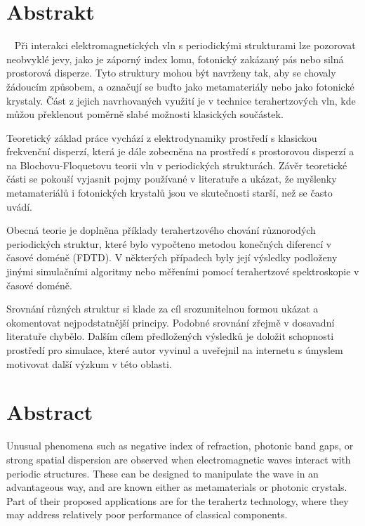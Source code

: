 
\vspace{-20mm}
\chapter*{Abstrakt}
\noindent ~
Při interakci elektromagnetických vln s periodickými strukturami lze pozorovat neobvyklé jevy, jako je záporný index lomu, fotonický zakázaný pás nebo silná prostorová disperze. Tyto struktury mohou být navrženy tak, aby se chovaly žádoucím způsobem, a označují se buďto jako metamateriály nebo jako fotonické krystaly. Část z jejich navrhovaných využití je v technice terahertzových vln, kde můžou překlenout poměrně slabé možnosti klasických součástek.  

Teoretický základ práce vychází z elektrodynamiky prostředí s klasickou frekvenční disperzí, která je dále zobecněna na prostředí s prostorovou disperzí a na Blochovu-Floquetovu teorii vln v periodických strukturách. Závěr teoretické části se pokouší vyjasnit pojmy používané v literatuře a ukázat, že myšlenky metamateriálů i fotonických krystalů jsou ve skutečnosti starší, než se často uvádí.

Obecná teorie je doplněna příklady terahertzového chování různorodých periodických struktur, které bylo vypočteno metodou konečných diferencí v časové doméně (FDTD). V některých případech byly její výsledky podloženy jinými simulačními algoritmy nebo měřeními pomocí terahertzové spektroskopie v časové doméně.

Srovnání  různých struktur si klade za cíl srozumitelnou formou ukázat a okomentovat nejpodstatnější principy. Podobné srovnání zřejmě v dosavadní literatuře chybělo. Dalším cílem předložených výsledků je doložit schopnosti prostředí pro simulace, které autor vyvinul a uveřejnil na internetu s úmyslem motivovat další výzkum v této oblasti. 

\vspace{0mm}
{\let\clearpage\relax\chapter*{Abstract}}
\noindent
Unusual phenomena such as negative index of refraction, photonic band gaps, or strong spatial dispersion are observed when electromagnetic waves interact with periodic structures. These can be designed to manipulate the wave in an advantageous way, and are known either as metamaterials or photonic crystals. Part of their proposed applications are for the terahertz technology, where they may address relatively poor performance of classical components.

